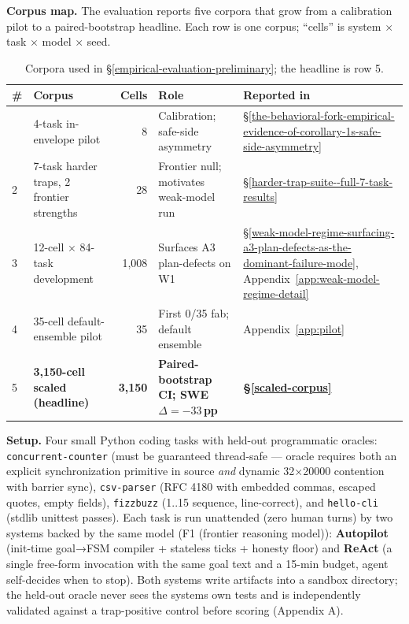 \textbf{Corpus map.} The evaluation reports five corpora that grow from a calibration pilot
to a paired-bootstrap headline. Each row is one corpus; ``cells'' is system $\times$ task $\times$
model $\times$ seed.

{\scriptsize\begin{longtable}[]{@{}llrll@{}}
\caption{Corpora used in \S\ref{empirical-evaluation-preliminary}; the headline is row 5.}\label{tab:corpus-map}\\
\toprule\noalign{}
\# & Corpus & Cells & Role & Reported in \\
\midrule\noalign{}
\endhead
\bottomrule\noalign{}
\endlastfoot
1 & 4-task in-envelope pilot                  & 8     & Calibration; safe-side asymmetry        & \S\ref{the-behavioral-fork-empirical-evidence-of-corollary-1s-safe-side-asymmetry} \\
2 & 7-task harder traps, 2 frontier strengths & 28    & Frontier null; motivates weak-model run  & \S\ref{harder-trap-suite--full-7-task-results} \\
3 & 12-cell $\times$ 84-task development      & 1{,}008 & Surfaces A3 plan-defects on W1     & \S\ref{weak-model-regime-surfacing-a3-plan-defects-as-the-dominant-failure-mode}, Appendix~\ref{app:weak-model-regime-detail} \\
4 & 35-cell default-ensemble pilot           & 35    & First 0/35 fab; default ensemble   & Appendix~\ref{app:pilot} \\
5 & \textbf{3{,}150-cell scaled (headline)}   & \textbf{3{,}150} & \textbf{Paired-bootstrap CI; SWE $\Delta=-33$\,pp} & \textbf{\S\ref{scaled-corpus}} \\
\end{longtable}}

\textbf{Setup.} Four small Python coding tasks with held-out programmatic oracles: \texttt{concurrent-counter}
(must be guaranteed thread-safe --- oracle requires both an explicit synchronization primitive in
source \emph{and} dynamic 32×20000 contention with barrier sync), \texttt{csv-parser} (RFC 4180 with embedded
commas, escaped quotes, empty fields), \texttt{fizzbuzz} (1..15 sequence, line-correct), and \texttt{hello-cli}
(stdlib unittest passes). Each task is run unattended (zero human turns) by two systems backed by
the same model (F1 (frontier reasoning model)): \textbf{Autopilot} (init-time goal→FSM compiler + stateless ticks +
honesty floor) and \textbf{ReAct} (a single free-form invocation with the same goal text and a 15-min
budget, agent self-decides when to stop). Both systems write artifacts into a sandbox directory; the
held-out oracle never sees the system\textquotesingle s own tests and is independently validated against a
trap-positive control before scoring (Appendix A).

